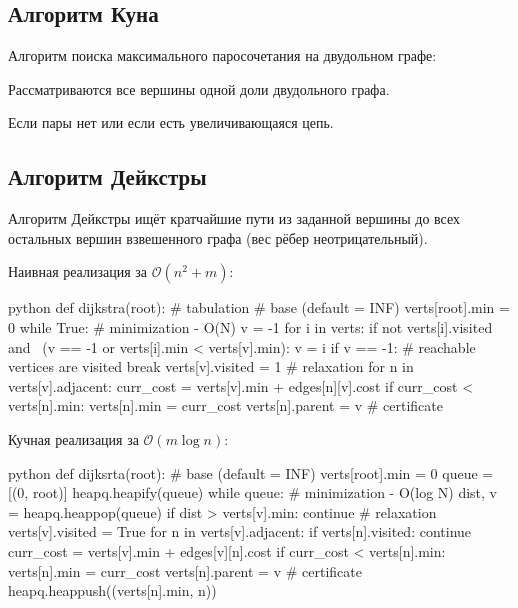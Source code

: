 \subsection{Алгоритм Куна}

{\bold Алгоритм} поиска максимального паросочетания на двудольном графе:


\begin{list*}[][\#]
\item Рассматриваются все вершины {\ital одной доли} двудольного графа.
\item Если пары нет или если есть {\ital увеличивающаяся цепь}.
\end{list*}

\subsection{Алгоритм Дейкстры}

{\bold Алгоритм Дейкстры} ищёт кратчайшие пути из заданной вершины до всех остальных вершин взвешенного графа {\ital\color{desc} (вес рёбер неотрицательный)}.

{\bold Наивная} реализация за $\mathcal{O}(n^2+m)$:

\begin{code}{python}
def dijkstra(root): # tabulation
  # base (default = INF)
  verts[root].min = 0
  while True:
    # minimization - O(N)
    v = -1
    for i in verts:
      if not verts[i].visited and \
         (v == -1 or verts[i].min < verts[v].min):
           v = i
    if v == -1: # reachable vertices are visited
      break
    verts[v].visited = 1
    # relaxation
    for n in verts[v].adjacent:
      curr_cost = verts[v].min + edges[n][v].cost
      if curr_cost < verts[n].min:
        verts[n].min = curr_cost
        verts[n].parent = v # certificate
\end{code}

{\bold Кучная} реализация за $\mathcal{O}(m\log n)$:

\begin{code}{python}
def dijksrta(root):
  # base (default = INF)
  verts[root].min = 0
  queue = [(0, root)]
  heapq.heapify(queue)
  while queue:
    # minimization - O(log N)
    dist, v = heapq.heappop(queue)
    if dist > verts[v].min:
      continue
    # relaxation
    verts[v].visited = True
    for n in verts[v].adjacent:
      if verts[n].visited:
        continue
      curr_cost = verts[v].min + edges[v][n].cost
      if curr_cost < verts[n].min:
        verts[n].min = curr_cost
        verts[n].parent = v # certificate
        heapq.heappush((verts[n].min, n))
\end{code}

